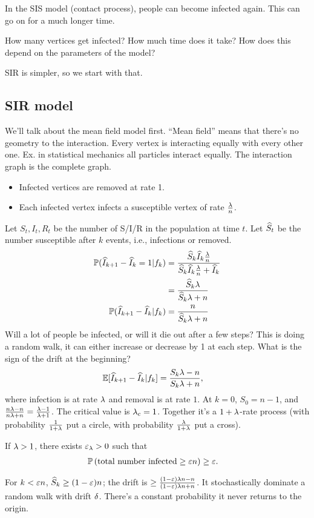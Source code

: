In the SIS model (contact process), people can become infected again. This can go on for a much longer time.

How many vertices get infected? How much time does it take? How does this depend on the parameters of the model?

SIR is simpler, so we start with that.
\subsection{SIR model}
We'll talk about the mean field model first.
``Mean field'' means that there's no geometry to the interaction. Every vertex is interacting equally with every other one. Ex. in statistical mechanics all particles interact equally. The interaction graph is the complete graph.

\begin{itemize}
\item
Infected vertices are removed at rate 1.
\item
Each infected vertex infects a susceptible vertex of rate $\frac{\lambda}{n}$.
\end{itemize}
Let $S_t,I_t,R_t$ be the number of S/I/R in the population at time $t$.
Let $\widehat{S}_t$ be the number susceptible after $k$ events, i.e., infections or removed.
\begin{align}
\mathbb{P}(\widehat{I}_{k+1} - \widehat{I}_k = 1|f_k)
&= \frac{\widehat{S}_k \widehat{I}_k \frac{\lambda}{n}}{\widehat{S}_k \widehat{I}_k \frac{\lambda}{n} + \widehat{I}_k}\\
&=\frac{\widehat{S}_k \lambda}{\widehat{S}_k\lambda+n}\\
\mathbb{P}(\widehat{I}_{k+1} - \widehat{I}_k |f_k)&=\frac{n}{\widehat{S}_k \lambda + n}
\end{align}
Will a lot of people be infected, or will it die out after a few steps?
This is doing a random walk, it can either increase or decrease by 1 at each step.
What is the sign of the drift at the beginning? 
\begin{align}
\E[\wh I_{k+1}-\wh I_k | f_k]
&=\fc{S_k \la - n}{S_k \la + n}, %
\end{align}
where infection is at rate $\lambda$ and removal is at rate $1$. At $k=0$, $S_0=n-1$, and $\frac{n\lambda - n }{n\lambda + n}=\frac{\lambda-1}{\lambda+1}$. The critical value is $\lambda_c=1$. 
Together it's a $1+\lambda$-rate process (with probability $\frac{1}{1+\lambda}$ put a circle, with probability $\frac{\lambda}{1+\lambda}$ put a cross).

\begin{thm}
If $\lambda>1$, there exists $\varepsilon_\lambda>0$ such that 
\begin{align}
\mathbb{P}\left( {\text{total number infected}\ge \varepsilon n} \right)&\ge \varepsilon.
\end{align}
\end{thm}
For $k<\varepsilon n$, $\widehat{S}_k \ge (1-\varepsilon) n$; the drift is $\ge \frac{(1-\varepsilon)\lambda n-n}{(1-\varepsilon) \lambda n + n}$.
It stochastically dominate a random walk with drift $\delta$. There's a constant probability it never returns to the origin.

